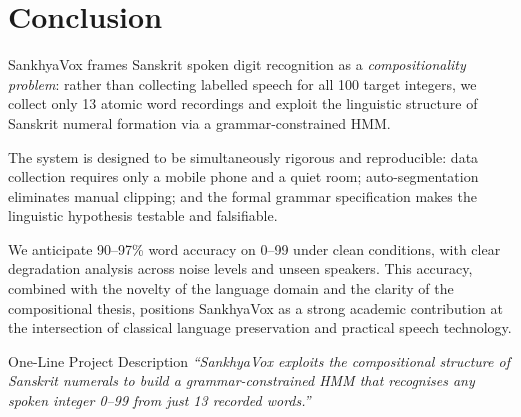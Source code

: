 \documentclass[12pt,a4paper]{article}
\begin{document}
\section{Conclusion}

SankhyaVox frames Sanskrit spoken digit recognition as a
\emph{compositionality problem}: rather than collecting labelled speech for
all 100 target integers, we collect only 13 atomic word recordings and
exploit the linguistic structure of Sanskrit numeral formation via a
grammar-constrained HMM.

The system is designed to be simultaneously rigorous and reproducible:
data collection requires only a mobile phone and a quiet room;
auto-segmentation eliminates manual clipping; and the formal grammar
specification makes the linguistic hypothesis testable and falsifiable.

We anticipate 90--97\% word accuracy on 0--99 under clean conditions,
with clear degradation analysis across noise levels and unseen speakers.
This accuracy, combined with the novelty of the language domain and
the clarity of the compositional thesis, positions SankhyaVox as a
strong academic contribution at the intersection of classical language
preservation and practical speech technology.

\vspace{1cm}
\begin{keybox}{One-Line Project Description}
\textit{``SankhyaVox exploits the compositional structure of Sanskrit numerals
to build a grammar-constrained HMM that recognises any spoken integer 0--99
from just 13 recorded words.''}
\end{keybox}
\end{document}
